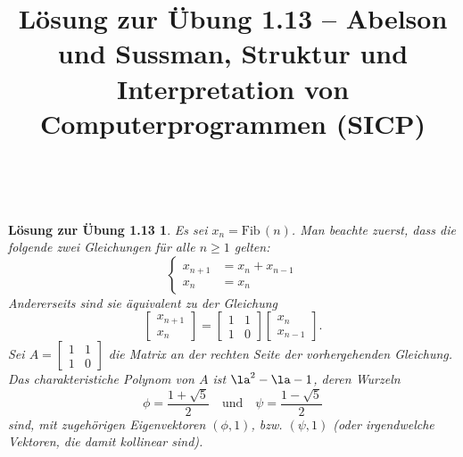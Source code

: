 \documentclass[a4paper,11pt,reqno]{amsart}
\theoremstyle{uremark}
\newtheorem*{loes}{L\"osung zur \"Ubung 1.13}
\begin{document}
\title[]{L\"osung zur \"Ubung 1.13 -- Abelson und Sussman, Struktur und
    Interpretation von Computerprogrammen (SICP)} 

\author{\href{https://github.com/pzuehlke}{}}
\maketitle
\


\begin{loes} 
    Es sei $ x_n = \text{Fib}\,(n) $. Man beachte zuerst, dass die folgende
    zwei Gleichungen f\"ur alle $ n \ge 1 $ gelten:
    \begin{equation*}%
        \begin{cases}
            x_{n + 1} & = x_{n} + x_{n - 1} \\
            x_n & = x_n
        \end{cases}
    \end{equation*}
    Andererseits sind sie \"aquivalent zu der Gleichung
    \begin{equation*}%
        \begin{bmatrix}
            x_{n + 1} \\
            x_n
        \end{bmatrix} =\begin{bmatrix}
            1 & 1 \\
            1 & 0 
        \end{bmatrix}
        \begin{bmatrix}
            x_n \\
            x_{n - 1}
        \end{bmatrix}.
        \end{equation*}
        Sei $ A = \begin{bmatrix}
            1 & 1 \\
            1 & 0 
        \end{bmatrix} $ die Matrix an der rechten Seite der vorhergehenden
        Gleichung. Das
        charakteristiche Polynom von $ A $ ist $ \la^2 - \la - 1 $, deren
        Wurzeln
        \begin{equation*}%
            \phi = \frac{1 + \sqrt{5}}{2} \quad \text{und} \quad \psi = \frac{1
            - \sqrt{5}}{2}
        \end{equation*}
        sind, mit zugeh\"origen Eigenvektoren $ (\phi, 1) $, bzw. $ (\psi, 1) $
        (oder irgendwelche Vektoren, die damit kollinear sind).


\end{loes}
\end{document}
